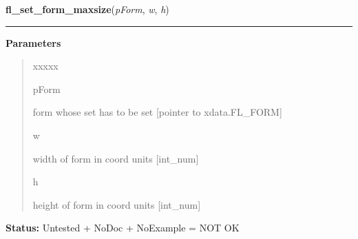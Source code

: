 \hspace{.8\funcindent}\begin{boxedminipage}{\funcwidth}

    \raggedright \textbf{fl\_set\_form\_maxsize}(\textit{pForm}, \textit{w}, \textit{h})

    \vspace{-1.5ex}

    \rule{\textwidth}{0.5\fboxrule}
\setlength{\parskip}{2ex}
\setlength{\parskip}{1ex}
      \textbf{Parameters}
      \vspace{-1ex}

      \begin{quote}
        \begin{Ventry}{xxxxx}

          \item[pForm]

          form whose set has to be set [pointer to xdata.FL\_FORM]

          \item[w]

          width of form in coord units [int\_num]

          \item[h]

          height of form in coord units [int\_num]

        \end{Ventry}

      \end{quote}

\textbf{Status:} Untested + NoDoc + NoExample = NOT OK



    \end{boxedminipage}

    \label{xformslib:library:fl_set_form_event_cmask}

    \vspace{0.5ex}

